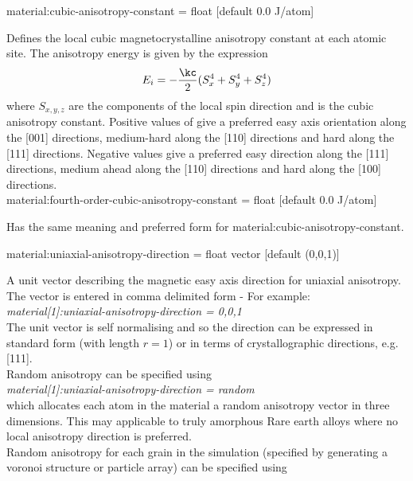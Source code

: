 {\zicf material:cubic-anisotropy-constant = float [default 0.0 J/atom]}
Defines the local cubic magnetocrystalline anisotropy constant at each atomic site. The anisotropy energy is given by the expression
\begin{equation*}
E_i = -\frac{\kc}{2} (S_x^4 + S_y^4 + S_z^4)
\end{equation*}
where $S_{x,y,z}$ are the components of the local spin direction and \kc is
the cubic anisotropy constant. Positive values of \kc give a preferred easy
axis orientation along the [001] directions, medium-hard along the [110]
directions and hard along the [111] directions. Negative values give a preferred
easy direction along the [111] directions, medium ahead along the [110]
directions and hard along the [100] directions. \\

{\zicf material:fourth-order-cubic-anisotropy-constant = float [default 0.0 J/atom]}
Has the same meaning and preferred form for material:cubic-anisotropy-constant.

{\zicf material:uniaxial-anisotropy-direction = float vector [default (0,0,1)]}
A unit vector \ei describing the magnetic easy axis direction for uniaxial
anisotropy. The vector is entered in comma delimited form - For example:\\

\textit{material[1]:uniaxial-anisotropy-direction = 0,0,1}\\

\noindent The unit vector is self normalising and so the direction can be
expressed in standard form (with length $r =  1$) or in terms of
crystallographic directions, e.g. [111].\\

Random anisotropy can be specified using\\

\textit{material[1]:uniaxial-anisotropy-direction = random}\\

which allocates each atom in the material a random anisotropy vector in three
dimensions. This may applicable to truly amorphous Rare earth alloys where no
local anisotropy direction is preferred.\\

Random anisotropy for each grain in the simulation (specified by generating a
voronoi structure or particle array) can be specified using\\

